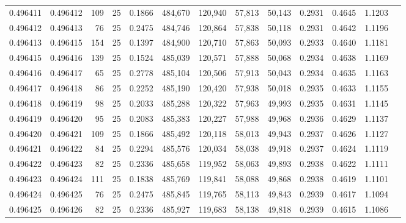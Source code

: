 \begin{tabular}{rrrrrrrrrrrrr}
0.496411 & 0.496412 &   109 &  25 &                                     0.1866 & 484,670 & 120,940 &  57,813 &  50,143 & 0.2931 & 0.4645 & 1.1203 \\
0.496412 & 0.496413 &    76 &  25 &                                     0.2475 & 484,746 & 120,864 &  57,838 &  50,118 & 0.2931 & 0.4642 & 1.1196 \\
0.496413 & 0.496415 &   154 &  25 &                                     0.1397 & 484,900 & 120,710 &  57,863 &  50,093 & 0.2933 & 0.4640 & 1.1181 \\
0.496415 & 0.496416 &   139 &  25 &                                     0.1524 & 485,039 & 120,571 &  57,888 &  50,068 & 0.2934 & 0.4638 & 1.1169 \\
0.496416 & 0.496417 &    65 &  25 &                                     0.2778 & 485,104 & 120,506 &  57,913 &  50,043 & 0.2934 & 0.4635 & 1.1163 \\
0.496417 & 0.496418 &    86 &  25 &                                     0.2252 & 485,190 & 120,420 &  57,938 &  50,018 & 0.2935 & 0.4633 & 1.1155 \\
0.496418 & 0.496419 &    98 &  25 &                                     0.2033 & 485,288 & 120,322 &  57,963 &  49,993 & 0.2935 & 0.4631 & 1.1145 \\
0.496419 & 0.496420 &    95 &  25 &                                     0.2083 & 485,383 & 120,227 &  57,988 &  49,968 & 0.2936 & 0.4629 & 1.1137 \\
0.496420 & 0.496421 &   109 &  25 &                                     0.1866 & 485,492 & 120,118 &  58,013 &  49,943 & 0.2937 & 0.4626 & 1.1127 \\
0.496421 & 0.496422 &    84 &  25 &                                     0.2294 & 485,576 & 120,034 &  58,038 &  49,918 & 0.2937 & 0.4624 & 1.1119 \\
0.496422 & 0.496423 &    82 &  25 &                                     0.2336 & 485,658 & 119,952 &  58,063 &  49,893 & 0.2938 & 0.4622 & 1.1111 \\
0.496423 & 0.496424 &   111 &  25 &                                     0.1838 & 485,769 & 119,841 &  58,088 &  49,868 & 0.2938 & 0.4619 & 1.1101 \\
0.496424 & 0.496425 &    76 &  25 &                                     0.2475 & 485,845 & 119,765 &  58,113 &  49,843 & 0.2939 & 0.4617 & 1.1094 \\
0.496425 & 0.496426 &    82 &  25 &                                     0.2336 & 485,927 & 119,683 &  58,138 &  49,818 & 0.2939 & 0.4615 & 1.1086 \\

\end{tabular}
